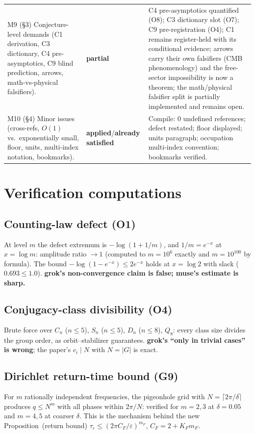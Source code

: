 \documentclass[11pt,a4paper]{article}
\newcommand{\ok}{\textbf{applied}}
\newcommand{\pver}{\textbf{partial}}
\newcommand{\sat}{\textbf{already satisfied}}
\begin{document}
\begin{longtable}{@{}p{}p{}p{}@{}}
M9 (\S3) Conjecture-level demands (C1 derivation, C3 dictionary, C4
pre-asymptotics, C9 blind prediction, arrows, math-vs-physical falsifiers). &
\pver & C4 pre-asymptotics quantified (O8); C3 dictionary slot (O7); C9
pre-registration (O4); C1 remains register-held with its conditional evidence;
arrows carry their own falsifiers (CMB phenomenology) and the free-sector
impossibility is now a theorem; the math/physical falsifier split is partially
implemented and remains open.\\
M10 (\S4) Minor issues (cross-refs, $O(1)$ vs.\ exponentially small, floor,
units, multi-index notation, bookmarks). & \ok/\sat & Compile: 0 undefined
references; defect restated; floor displayed; units paragraph; occupation
multi-index convention; bookmarks verified.\\
\bottomrule
\end{longtable}

\section{Verification computations}

\subsection{Counting-law defect (O1)}
At level $m$ the defect extremum is $-\log(1+1/m)$, and $1/m=e^{-x}$ at
$x=\log m$: amplitude ratio $\to1$ (computed to $m=10^{6}$ exactly and
$m=10^{100}$ by formula). The bound $-\log(1-e^{-x})\le 2e^{-x}$ holds at
$x=\log 2$ with slack ($0.693\le1.0$). \textbf{grok's non-convergence claim is
false; muse's estimate is sharp.}

\subsection{Conjugacy-class divisibility (O4)}
Brute force over $C_n$ ($n\le5$), $S_n$ ($n\le5$), $D_n$ ($n\le8$), $Q_8$:
every class size divides the group order, as orbit--stabilizer guarantees.
\textbf{grok's ``only in trivial cases'' is wrong}; the paper's $c_i\mid N$
with $N=|G|$ is exact.

\subsection{Dirichlet return-time bound (G9)}
For $m$ rationally independent frequencies, the pigeonhole grid with
$N=\lceil 2\pi/\delta\rceil$ produces $q\le N^m$ with all phases within
$2\pi/N$: verified for $m=2,3$ at $\delta=0.05$ and $m=4,5$ at coarser
$\delta$. This is the mechanism behind the new Proposition~(return bound)
$\tau_\varepsilon\le(2\pi C_F/\varepsilon)^{m_F}$, $C_F=2+K_Fm_F$.
\end{document}
